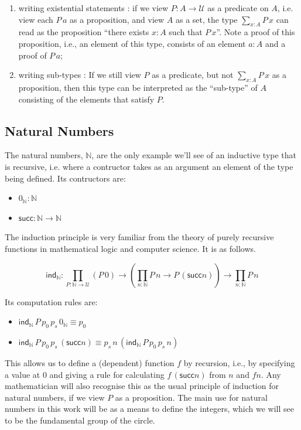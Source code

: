 \documentclass[12 pt]{amsart}
\theoremstyle{definition}
\theoremstyle{remark}
\newcommand{\Type}{\mathcal{U}}
\newcommand{\ind}{\mathsf{ind}}
\newcommand{\suc}{\mathsf{succ}}
\newcommand{\nat}{{\mathbb{N}}}
\newcommand{\zeronat}{0_\nat}
\begin{document}
\begin{enumerate}
\item writing existential statements : if we view $P : A\to \Type$ as a predicate on $A$, i.e. view each $P \, a$ as a proposition, and view $A$ as a set, the type $\sum_{x : A} P\, x$ can read as the proposition ``there exists $x : A$ such that $P\, x$''. Note a proof of this proposition, i.e., an element of this type, consists of an element $a : A$ and a proof of $P \, a$;
\item writing sub-types : If we still view $P$ as a predicate, but not $\sum_{x : A} P\, x$ as a proposition, then this type can be interpreted as the ``sub-type'' of $A$ consisting of the elements that satisfy $P$.
\end{enumerate}

\subsection{Natural Numbers}
The natural numbers, $\mathbb{N}$, are the only example we'll see of an inductive type that is recursive, i.e. where a contructor takes as an argument an element of the type being defined. Its contructors are:

\begin{itemize}
\item $\zeronat : \nat$
\item $\suc : \nat\to\nat$
\end{itemize}

The induction principle is very familiar from the theory of purely recursive functions in mathematical logic and computer science. It is as follows.

\[\ind_\nat : \prod_{P : \nat \to \Type} (P \, 0) \to \left( \prod_{n : \nat} P \, n \to P\, (\suc n )\right) \to \prod_{n : \nat} P\,n\]

Its computation rules are:

\begin{itemize}
\item $\ind_\nat \, P\, p_0\, p_s \, \zeronat \equiv p_0$
\item $\ind_\nat \, P\, p_0\, p_s \, (\suc n) \equiv p_s\, n\, (\ind_\nat \, P\, p_0\, p_s \, n)$
\end{itemize}
This allows us to define a (dependent) function $f$ by recursion, i.e., by specifying a value at $0$ and giving a rule for calculating $f\, (\suc n)$ from $n$ and $f n$. Any mathematician will also recognise this as the usual principle of induction for natural numbers, if we view $P$ as a proposition. The main use for natural numbers in this work will be as a means to define the integers, which we will see to be the fundamental group of the circle.
\end{document}
